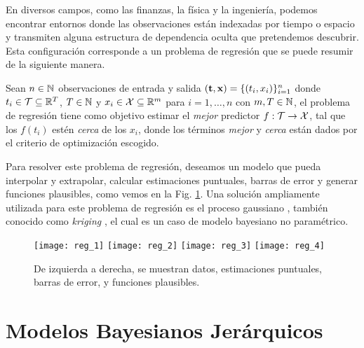 En diversos campos, como las finanzas, la física y la ingeniería, podemos encontrar entornos donde las observaciones están indexadas por tiempo o espacio y transmiten alguna estructura de dependencia oculta que pretendemos descubrir. Esta configuración corresponde a un problema de regresión que se puede resumir de la siguiente manera.

Sean \(n \in \mathbb{N}\) observaciones de entrada y salida \((\mathbf{t}, \mathbf{x}) = \{(t_i, x_i)\}_{i=1}^n\) donde \(t_i \in \mathcal{T} \subseteq \mathbb{R}^T\), \(T \in \mathbb{N}\) y \(x_i \in \mathcal{X} \subseteq \mathbb{R}^m\) para \(i = 1, \dotsc, n\) con \(m,T \in \mathbb{N}\), el problema de regresión tiene como objetivo estimar el \emph{mejor} predictor \(f : \mathcal{T} \to \mathcal{X}\), tal que los \(f(t_i)\) estén \emph{cerca} de los \(x_i\), donde los términos \emph{mejor} y \emph{cerca} están dados por el criterio de optimización escogido. 

Para resolver este problema de regresión, deseamos un modelo que pueda interpolar y extrapolar, calcular estimaciones puntuales, barras de error y generar funciones plausibles, como vemos en la Fig. \ref{fig:regression_problem}. Una solución ampliamente utilizada para este problema de regresión es el proceso gaussiano \cite{rasmussen06}, también conocido como \emph{kriging} \cite{stein2012interpolation,cressie1990origins}, el cual es un caso de modelo bayesiano no paramétrico.

\begin{figure}[!h]
	\texttt{[image: reg\_1]}
	\texttt{[image: reg\_2]}
	\texttt{[image: reg\_3]}
	\texttt{[image: reg\_4]}
	\caption{De izquierda a derecha, se muestran datos, estimaciones puntuales, barras de error, y funciones plausibles.}
	\label{fig:regression_problem}
\end{figure}

\section{Modelos Bayesianos Jerárquicos}
\label{sec:hierarchical}

